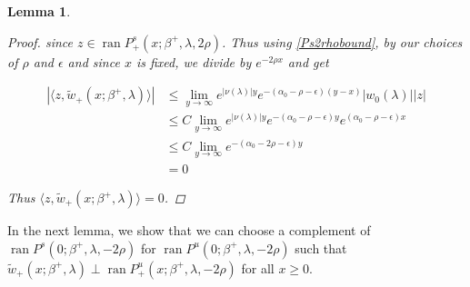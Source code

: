 \documentclass[12pt]{article}
\DeclareMathOperator{\ran}{ran}
\newtheorem{lemma}{Lemma}
\begin{document}
\begin{lemma}
\begin{proof}
since $z \in \ran P^s_+(x; \beta^+, \lambda, 2 \rho)$. Thus using \eqref{Ps2rhobound}, by our choices of $\rho$ and $\epsilon$ and since $x$ is fixed, we divide by $e^{-2 \rho x}$ and get

\begin{align*}
|\langle z, \tilde{w}_+(x; \beta^+, \lambda) \rangle| 
&\leq \lim_{y \rightarrow \infty} e^{|\nu(\lambda)| y } e^{-(\alpha_0 - \rho - \epsilon)(y - x)} |w_0(\lambda) ||z| \\
&\leq C \lim_{y \rightarrow \infty} e^{|\nu(\lambda)| y } e^{-(\alpha_0 - \rho - \epsilon)y} e^{(\alpha_0 - \rho - \epsilon)x} \\
&\leq C \lim_{y \rightarrow \infty} e^{-(\alpha_0 - 2 \rho - \epsilon)y}  \\
&= 0
\end{align*}

Thus $\langle z, \tilde{w}_+(x; \beta^+, \lambda) \rangle = 0$.

\end{proof}
\end{lemma}

In the next lemma, we show that we can choose a complement of $\ran P^s(0; \beta^+, \lambda, -2 \rho)$ for $\ran P^u(0; \beta^+, \lambda, -2 \rho)$ such that $\tilde{w}_+(x; \beta^+, \lambda) \perp \ran P^u_+(x; \beta^+, \lambda, -2 \rho)$ for all $x \geq 0$. 

\end{document}

